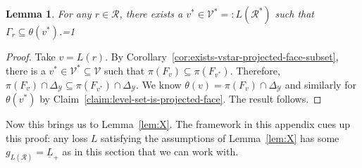 \documentclass[11pt]{article}
\newcommand{\Comments}{1}
\newcommand{\mytodo}[2]{\ifnum\Comments=1%
  \todo[linecolor=#1!80!black,backgroundcolor=#1,bordercolor=#1!80!black]{#2}\fi}
\newcommand{\btw}[1]{\mytodo{gray!20!white}{BTW: #1}}%
\newcommand{\simplex}{\Delta_\Y}
\newcommand{\R}{\mathcal{R}}
\newcommand{\V}{\mathcal{V}}
\newcommand{\Y}{\mathcal{Y}}
\newcommand{\risk}[1]{\underline{#1}}
\newtheorem{lemma}{Lemma}
\begin{document}
\begin{lemma}\label{lem:any-levelset-contained-in-minlevelset}
  For any $r \in \R$, there exists a $v^* \in \V^* =: L(\R^*)$ such that $\Gamma_r \subseteq \theta(v^*)$.\btw{(7)}
\end{lemma}
\begin{proof}
  Take $v = L(r)$.
  By Corollary~\ref{cor:exists-vstar-projected-face-subset}, there is a $v^* \in \V^* \subseteq \V$ such that $\pi(F_v) \subseteq \pi(F_{v^*})$.
  Therefore, $\pi(F_v) \cap \simplex \subseteq \pi(F_{v^*})\cap \simplex$.  
  We know $\theta(v) = \pi(F_v) \cap \simplex$ and similarly for $\theta(v^*)$ by Claim~\ref{claim:level-set-is-projected-face}.
  The result follows.
\end{proof}



Now this brings us to Lemma~\ref{lem:X}.
The framework in this appendix cues up this proof: any loss $L$ satisfying the assumptions of Lemma~\ref{lem:X} has some $g_{L(\R)} = \risk{L}_+$ as in this section that we can work with. 
\end{document}
